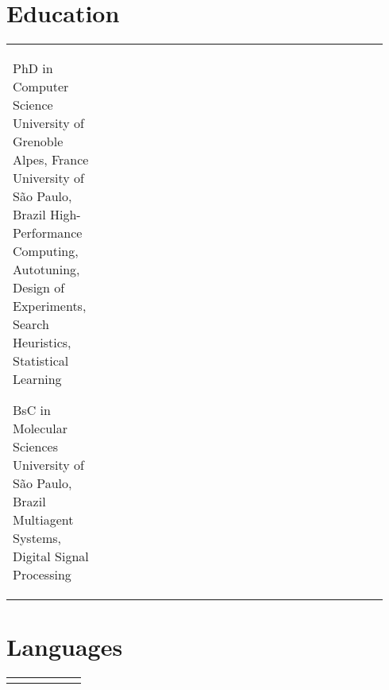 \documentclass[a4paper,10pt]{article}
\begin{document}
\begin{paracol}{2}
\smallskip %

\section{Education}
\label{sec:orgb8ef2ce}
\begin{supertabular}{R{0.24\linewidth}L{0.7\linewidth}}
    {PhD in Computer Science}
    {University of Grenoble Alpes, France}
    {University of São Paulo, Brazil}
    {High-Performance Computing, Autotuning, Design of Experiments, Search
    Heuristics, Statistical Learning}

    {BsC in Molecular Sciences}
    {}
    {University of São Paulo, Brazil}
    {Multiagent Systems, Digital Signal Processing}

\end{supertabular}

\section{Languages}
\label{sec:org40abd7d}
\begin{center}
\begin{supertabular}{R{0.3\linewidth}C{0.17\linewidth}L{0.3\linewidth}}
\end{supertabular}
\end{center}
\end{paracol}
\smallskip
\end{document}
